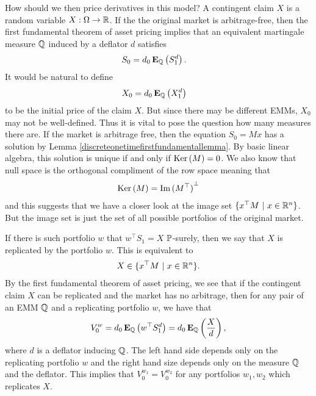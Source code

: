How should we then price derivatives in this model? A contingent claim $X$ is a random variable $X : \Omega \rightarrow \mathbb{R}$. If the the original market is arbitrage-free, then the first fundamental theorem of asset pricing implies that an equivalent martingale measure $\mathbb{Q}$ induced by a deflator $d$ satisfies
  \begin{align}
    S_0 & = d_0 \operatorname{\boldsymbol{\mathrm{E}}}_{\mathbb{Q}} \left( S^d_1 \right) .
  \end{align}
It would be natural to define
  	\begin{align}
		X_0 & = d_0 \operatorname{\boldsymbol{\mathrm{E}}}_{\mathbb{Q}} \left( X^d_1 \right)
	\end{align}
to be the initial price of the claim $X$. But since there may be different EMMs, $X_0$ may not be well-defined. Thus it is vital to pose the question how many measures there are. If the market is arbitrage free, then the equation $S_0 = M x$ has a solution by Lemma \ref{discreteonetimefirstfundamentallemma}. By basic linear algebra, this solution is unique if and only if $\operatorname{\mathrm{Ker}}{ ( M ) } = 0$. We also know that null space is the orthogonal compliment of the row space meaning that
  \begin{align}
    \label{linearalgebraduality}
    \operatorname{\mathrm{Ker}}{ ( M ) } = \operatorname{\mathrm{Im}}{ (M^{\top}) }^{\perp} 
  \end{align} 
and this suggests that we have a closer look at the image set $\{ x^{\top} M \ | \ x \in \mathbb{R}^n \} $. But the image set is just the set of all possible portfolios of the original market.

If there is such portfolio $w$ that $w^{\top} S_1 = X$ $\mathbb{P}$-surely, then we say that $X$ is replicated by the portfolio $w$. This is equivalent to
	\begin{align}
		X \in \{ x^{\top} M \ | \ x \in \mathbb{R}^n \} .
	\end{align}
By the first fundamental theorem of asset pricing, we see that if the contingent claim $X$ can be replicated and the market has no arbitrage, then for any pair of an EMM $\mathbb{Q}$ and a replicating portfolio $w$, we have that 
  \begin{align}
    V_0^w = d_0 \operatorname{\boldsymbol{\mathrm{E}}}_{\mathbb{Q}} \left( w^{\top} S^d_1 \right) = d_0 \operatorname{\boldsymbol{\mathrm{E}}}_{\mathbb{Q}} \left( \frac{X}{d} \right),
  \end{align}
where $d$ is a deflator inducing $\mathbb{Q}$. The left hand side depends only on the replicating portfolio $w$ and the right hand size depends only on the measure $\mathbb{Q}$ and the deflator. This implies that $V_0^{w_1} = V_0^{w_2}$ for any portfolios $w_1, w_2$ which replicates $X$. 

